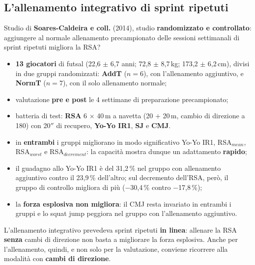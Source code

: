 \subsection{L'allenamento integrativo di sprint ripetuti}

Studio di \textbf{Soares-Caldeira e coll.} (2014), studio \textbf{randomizzato e controllato}:
aggiungere al normale allenamento precampionato delle sessioni settimanali di sprint ripetuti
migliora la RSA?

\begin{itemize}
  \item \textbf{13 giocatori} di futsal (22,6 $\pm$ 6,7 anni; 72,8 $\pm$ 8,7\,kg;
    173,2 $\pm$ 6,2\,cm), divisi in due gruppi randomizzati: \textbf{AddT} ($n = 6$), con
    l'allenamento aggiuntivo, e \textbf{NormT} ($n = 7$), con il solo allenamento normale;
  \item valutazione \textbf{pre e post} le 4 settimane di preparazione precampionato;
  \item batteria di test: \textbf{RSA} 6 $\times$ 40\,m a navetta (20 $+$ 20\,m, cambio di
    direzione a 180\textdegree) con 20$''$ di recupero, \textbf{Yo-Yo IR1}, \textbf{SJ} e
    \textbf{CMJ}.
\end{itemize}

\begin{itemize}
  \item in \textbf{entrambi} i gruppi migliorano in modo significativo Yo-Yo IR1, RSA$_{mean}$,
    RSA$_{worst}$ e RSA$_{decrement}$: la capacità mostra dunque un adattamento
    \textbf{rapido};
  \item il guadagno allo Yo-Yo IR1 è del 31,2\,\% nel gruppo con allenamento aggiuntivo contro il
    23,9\,\% dell'altro; sul decremento dell'RSA, però, il gruppo di controllo migliora di più
    ($-$30,4\,\% contro $-$17,8\,\%);
  \item la \textbf{forza esplosiva non migliora}: il CMJ resta invariato in entrambi i gruppi e lo
    squat jump peggiora nel gruppo con l'allenamento aggiuntivo.
\end{itemize}

L'allenamento integrativo prevedeva sprint ripetuti \textbf{in linea}: allenare la RSA
\textbf{senza} cambi di direzione non basta a migliorare la forza esplosiva. Anche per
l'allenamento, quindi, e non solo per la valutazione, conviene ricorrere alla modalità con
\textbf{cambi di direzione}.
